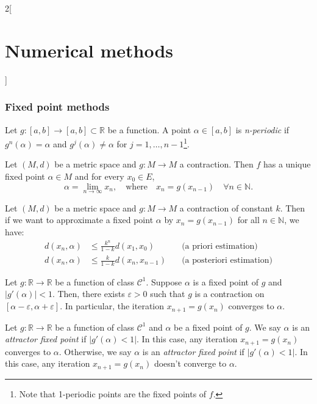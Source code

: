 \documentclass[class=article,10pt,crop=false]{standalone}
\begin{document}
\begin{multicols}{2}[\section{Numerical methods}]
\subsubsection*{Fixed point methods}
\begin{definition}
Let $g:[a,b]\rightarrow[a,b]\subset\mathbb{R}$ be a function. A point $\alpha\in[a,b]$ is \textit{n-periodic} if $g^n(\alpha)=\alpha$ and $g^j(\alpha)\ne\alpha$ for $j=1,\ldots,n-1$\footnote{Note that 1-periodic points are the fixed points of $f$.}.
\end{definition}
\begin{theorem}
Let $(M,d)$ be a metric space and $g:M\rightarrow M$ a contraction. Then $f$ has a unique fixed point $\alpha\in M$ and for every $x_0\in E$, $$\alpha=\lim_{n\to\infty}x_n,\quad\text{where}\quad x_n=g(x_{n-1})\quad\forall n\in\mathbb{N}.$$
\end{theorem}
\begin{prop}
Let $(M,d)$ be a metric space and $g:M\rightarrow M$ a contraction of constant $k$. Then if we want to approximate a fixed point $\alpha$ by $x_n=g(x_{n-1})$ for all $n\in\mathbb{N}$, we have:
\begin{align*}
    d(x_n,\alpha)&\leq\frac{k^n}{1-k}d(x_1,x_0)\quad&\text{(a priori estimation)}\\
    d(x_n,\alpha)&\leq\frac{k}{1-k}d(x_n,x_{n-1})\quad&\text{(a posteriori estimation)}
\end{align*}
\end{prop}
\begin{corollary}
Let $g:\mathbb{R}\rightarrow\mathbb{R}$ be a function of class $\mathcal{C}^1$. Suppose $\alpha$ is a fixed point of $g$ and $|g'(\alpha)|<1$. Then, there exists $\varepsilon>0$ such that $g$ is a contraction on $[\alpha-\varepsilon,\alpha+\varepsilon]$. In particular, the iteration $x_{n+1}=g(x_n)$ converges to $\alpha$.
\end{corollary}
\begin{definition}
Let $g:\mathbb{R}\rightarrow\mathbb{R}$ be a function of class $\mathcal{C}^1$ and $\alpha$ be a fixed point of $g$. We say $\alpha$ is an \textit{attractor fixed point} if $|g'(\alpha)<1|$. In this case, any iteration $x_{n+1}=g(x_n)$ converges to $\alpha$. Otherwise, we say $\alpha$ is an \textit{attractor fixed point} if $|g'(\alpha)<1|$. In this case, any iteration $x_{n+1}=g(x_n)$ doesn't converge to $\alpha$.
\end{definition}
\end{multicols}
\end{document}
